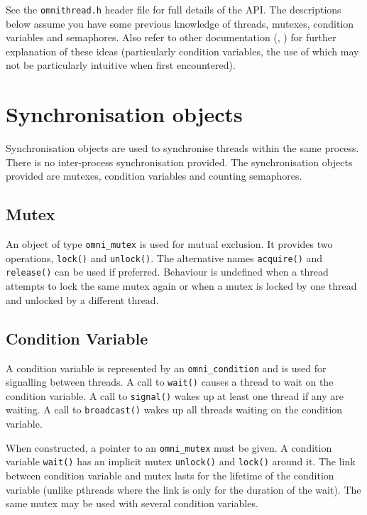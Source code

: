 \documentclass[11pt,twoside,a4paper]{article}
\begin{document}
See the \texttt{omnithread.h} header file for full details of the API.
The descriptions below assume you have some previous knowledge of
threads, mutexes, condition variables and semaphores.  Also refer to
other documentation (\cite{birrell}, \cite{pthreads}) for further
explanation of these ideas (particularly condition variables, the use
of which may not be particularly intuitive when first encountered).


\section{Synchronisation objects}

Synchronisation objects are used to synchronise threads within the
same process.  There is no inter-process synchronisation provided.
The synchronisation objects provided are mutexes, condition variables
and counting semaphores.

\subsection{Mutex}

An object of type \texttt{omni\_mutex} is used for mutual exclusion.
It provides two operations, \texttt{lock()} and \texttt{unlock()}.
The alternative names \texttt{acquire()} and \texttt{release()} can be
used if preferred.  Behaviour is undefined when a thread attempts to
lock the same mutex again or when a mutex is locked by one thread and
unlocked by a different thread.


\subsection{Condition Variable}

A condition variable is represented by an \texttt{omni\_condition} and
is used for signalling between threads.  A call to \texttt{wait()}
causes a thread to wait on the condition variable.  A call to
\texttt{signal()} wakes up at least one thread if any are waiting.  A
call to \texttt{broadcast()} wakes up all threads waiting on the
condition variable.

When constructed, a pointer to an \texttt{omni\_mutex} must be given.
A condition variable \texttt{wait()} has an implicit mutex
\texttt{unlock()} and \texttt{lock()} around it.  The link between
condition variable and mutex lasts for the lifetime of the condition
variable (unlike pthreads where the link is only for the duration of
the wait).  The same mutex may be used with several condition
variables.
\end{document}
